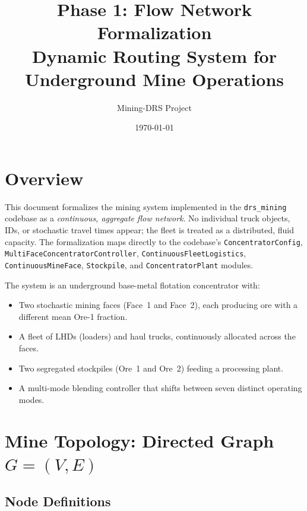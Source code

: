 \documentclass[11pt,a4paper]{article}
\title{%
  \textbf{Phase 1: Flow Network Formalization}\\[6pt]
  \large Dynamic Routing System for Underground Mine Operations}
\author{Mining-DRS Project}
\date{\today}
\theoremstyle{definition}
\begin{document}
\maketitle
\tableofcontents
\newpage

\section{Overview}

This document formalizes the mining system implemented in the
\texttt{drs\_mining} codebase as a \emph{continuous, aggregate flow network}.
No individual truck objects, IDs, or stochastic travel times appear; the
fleet is treated as a distributed, fluid capacity.  The formalization maps
directly to the codebase's \texttt{ConcentratorConfig},
\texttt{MultiFaceConcentratorController}, \texttt{ContinuousFleetLogistics},
\texttt{ContinuousMineFace}, \texttt{Stockpile}, and
\texttt{ConcentratorPlant} modules.

The system is an underground base-metal flotation concentrator with:
\begin{itemize}[nosep]
  \item Two stochastic mining faces (Face~1 and Face~2), each producing ore
        with a different mean Ore-1 fraction.
  \item A fleet of LHDs (loaders) and haul trucks, continuously allocated
        across the faces.
  \item Two segregated stockpiles (Ore~1 and Ore~2) feeding a processing
        plant.
  \item A multi-mode blending controller that shifts between seven distinct
        operating modes.
\end{itemize}


\section{Mine Topology: Directed Graph \texorpdfstring{$G = (V, E)$}{G = (V,E)}}
\label{sec:topology}

\subsection{Node Definitions}
\end{document}

